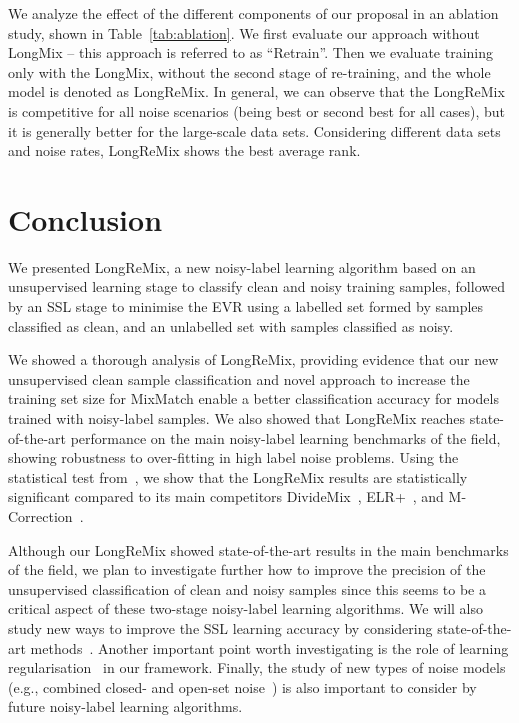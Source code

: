 \documentclass[review]{elsarticle}
\begin{document}
We analyze the effect of the different components of our proposal in an ablation study, shown in Table~\ref{tab:ablation}. 
We first evaluate our approach without LongMix -- this approach is referred to as ``Retrain''. 
Then we evaluate training only with the LongMix, without the second stage of re-training, and the whole model is denoted as LongReMix. 
In general, we can observe that the LongReMix is competitive for all noise scenarios (being best or second best for all cases), but it is generally better for the large-scale data sets.
Considering
different data sets and noise rates, LongReMix shows the best average rank.




\section{Conclusion}

We presented LongReMix, 
a new noisy-label learning algorithm based on an unsupervised learning stage to classify clean and noisy training samples, followed by an SSL stage to minimise the EVR using a labelled set formed by samples classified as clean, and an unlabelled set with samples classified as noisy.




We showed a thorough analysis of LongReMix, providing evidence that our new unsupervised clean sample classification and novel approach to increase the training set size for MixMatch enable a better classification accuracy for models trained with noisy-label samples. 
We also showed that LongReMix reaches state-of-the-art performance on the main noisy-label learning benchmarks of the field, showing robustness to over-fitting in high label noise problems.
Using the statistical test from~\cite{demvsar2006statistical}, we show that the LongReMix results are statistically significant compared to its main competitors DivideMix~\cite{li2020dividemix}, ELR+~\cite{liu2020early}, and M-Correction~\cite{arazo2019unsupervised}.

Although our LongReMix showed state-of-the-art results in the main benchmarks of the field, we plan to investigate further how to improve the precision of the unsupervised classification of clean and noisy samples since this seems to be a critical aspect of these two-stage noisy-label learning algorithms. We will also study new ways to improve the SSL learning accuracy by considering state-of-the-art methods~\cite{chen2020big}. Another important point worth investigating is the role of learning regularisation~\cite{wang2019symmetric,ma2020normalized,wang2019imae} in our framework.
Finally, the study of new types of noise models (e.g., combined closed- and open-set noise~\cite{sachdeva2021evidentialmix}) is also important to consider by future noisy-label learning algorithms.
\end{document}
